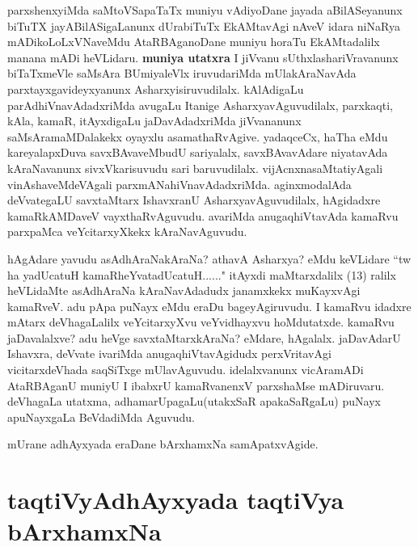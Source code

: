 \begin{artha}
parxshenxyiMda saMtoVSapaTaTx muniyu vAdiyoDane jayada aBilASeyanunx biTuTX jayABilASigaLanunx dUrabiTuTx EkAMtavAgi nAveV idara niNaRya mADikoLoLxVNaveMdu AtaRBAganoDane muniyu horaTu EkAMtadalilx manana mADi heVLidaru.
\textbf{muniya utatxra} I jiVvanu sUthxlashariVravanunx biTaTxmeVle saMsAra BUmiyaleVlx iruvudariMda mUlakAraNavAda parxtayxgavideyxyanunx Asharxyisiruvudilalx. kAlAdigaLu parAdhiVnavAdadxriMda avugaLu Itanige AsharxyavAguvudilalx, parxkaqti, kAla, kamaR, itAyxdigaLu jaDavAdadxriMda jiVvananunx saMsAramaMDalakekx oyayxlu asamathaRvAgive. yadaqceCx, haTha eMdu kareyalapxDuva savxBAvaveMbudU sariyalalx, savxBAvavAdare niyatavAda kAraNavanunx sivxVkarisuvudu sari baruvudilalx. vijAcnxnasaMtatiyAgali vinAshaveMdeVAgali parxmANahiVnavAdadxriMda. aginxmodalAda deVvategaLU savxtaMtarx IshavxranU AsharxyavAguvudilalx, hAgidadxre kamaRkAMDaveV vayxthaRvAguvudu. avariMda anugaqhiVtavAda kamaRvu parxpaMca veYcitarxyXkekx kAraNavAguvudu.

hAgAdare yavudu asAdhAraNakAraNa? athavA Asharxya? eMdu keVLidare ``tw ha yadUcatuH kamaRheYvatadUcatuH......" itAyxdi maMtarxdalilx (13) ralilx heVLidaMte asAdhAraNa kAraNavAdadudx janamxkekx muKayxvAgi kamaRveV. adu pApa puNayx eMdu eraDu bageyAgiruvudu. I kamaRvu idadxre mAtarx deVhagaLalilx veYcitarxyXvu veYvidhayxvu hoMdutatxde. kamaRvu jaDavalalxve? adu heVge savxtaMtarxkAraNa? eMdare, hAgalalx. jaDavAdarU Ishavxra, deVvate ivariMda anugaqhiVtavAgidudx  perxVritavAgi vicitarxdeVhada saqSiTxge mUlavAguvudu. idelalxvanunx  vicAramADi AtaRBAganU muniyU I ibabxrU kamaRvanenxV parxshaMse mADiruvaru. deVhagaLa utatxma, adhamarUpagaLu(utakxSaR \ndash apakaSaRgaLu) puNayx apuNayxgaLa BeVdadiMda Aguvudu.
\end{artha}


mUrane adhAyxyada eraDane bArxhamxNa samApatxvAgide.


\section*{taqtiVyAdhAyxyada taqtiVya bArxhamxNa}


